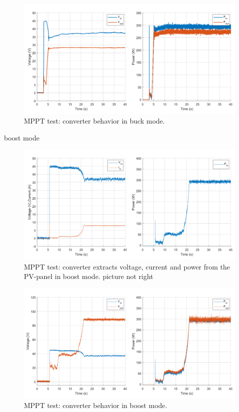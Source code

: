 \begin{figure}[H]
	\begin{center}
		\includegraphics[width=1\textwidth]{../Pictures/P1/Test/Buck_mode_MPPT_Vin_Vout_Pin_Pout}
		\caption{MPPT test: converter behavior in buck mode.}
		\label{MPPTtestbuckmode2}
	\end{center}	
\end{figure}



boost mode

\begin{figure}[H]
	\begin{center}
		\includegraphics[width=1\textwidth]{../Pictures/P1/Test/Boost_mode_MPPT_Vin_Iin_Pin}
		\caption{MPPT test: converter extracts voltage, current and power from the PV-panel in boost mode. picture not right}
		\label{MPPTtestboostmode1}
	\end{center}	
\end{figure}

\begin{figure}[H]
	\begin{center}
		\includegraphics[width=1\textwidth]{../Pictures/P1/Test/Boost_mode_MPPT_Vin_Vout_Iin_Pin_Pout}
		\caption{MPPT test: converter behavior in boost mode.}
		\label{MPPTtestboostmode2}
	\end{center}	
\end{figure}




